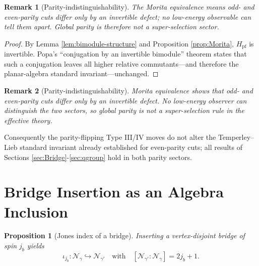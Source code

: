\documentclass[11pt]{article}
\newtheorem{proposition}{Proposition}[section]
\newtheorem{remark}{Remark}[section]
\begin{document}
\begin{remark}[Parity‐indistinguishability]
  The Morita equivalence means odd- and even-parity cuts differ only by an
  invertible defect; no low-energy observable can tell them apart.
  Global parity is therefore \emph{not} a super-selection sector.
\end{remark}

\begin{proof}
  By Lemma \ref{lem:bimodule-structure} and
  Proposition \ref{prop:Morita},
  $H_{\mathrm{pf}}$ is invertible.
  Popa’s “conjugation by an invertible bimodule” theorem
  \cite[Prop.\,2.3]{PopaMorita} states that such a conjugation
  leaves all higher relative commutants—and therefore
  the planar-algebra standard invariant—unchanged.
\end{proof}

\begin{remark}[Parity‐indistinguishability]
  Morita equivalence shows that odd- and even-parity cuts differ only by an
  invertible defect.  No low-energy observer can distinguish the two
  sectors, so global parity is not a super-selection rule in the effective
  theory.
\end{remark}

\noindent
Consequently the parity-flipping Type III/IV moves do not alter the
Temperley–Lieb standard invariant already established for even-parity
cuts; all results of Sections \ref{sec:Bridge}-\ref{sec:qgroup} hold in
both parity sectors.

\section{Bridge Insertion as an Algebra Inclusion}

\begin{proposition}[Jones index of a bridge]
  Inserting a vertex-disjoint bridge of spin $j_b$ yields
  \[
    \iota_{j_b}:\mathcal N_{\gamma}\hookrightarrow \mathcal N_{\gamma'}
    \quad\text{with}\quad
    [\mathcal N_{\gamma'}:\mathcal N_{\gamma}] = 2j_b+1.
  \]
\end{proposition}
\end{document}
